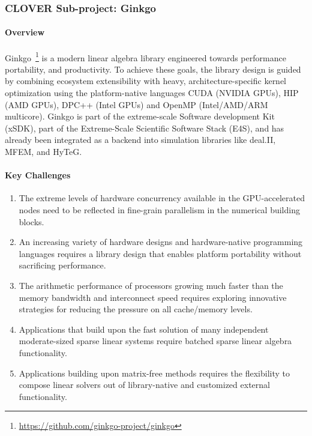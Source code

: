 \subsubsection{ CLOVER Sub-project: Ginkgo} \label{subsubsect:peeks}
\paragraph{Overview} 
Ginkgo~\footnote{\url{https://github.com/ginkgo-project/ginkgo}} is a modern
linear algebra library engineered towards performance portability, and
productivity. To achieve these goals, the library design is guided by combining
ecosystem extensibility with heavy, architecture-specific kernel optimization
using the platform-native languages CUDA (NVIDIA GPUs), HIP (AMD GPUs), DPC++
(Intel GPUs) and OpenMP (Intel/AMD/ARM multicore). Ginkgo is part of the
extreme-scale Software development Kit (xSDK), part of the Extreme-Scale
Scientific Software Stack (E4S), and has already been integrated as a backend
into simulation libraries like deal.II, MFEM, and HyTeG.



\paragraph{Key Challenges}
\begin{enumerate}
  \item The extreme levels of hardware concurrency available in the
		GPU-accelerated nodes need to be reflected in fine-grain parallelism in
		the numerical building blocks.
  \item An increasing variety of hardware designs and hardware-native
		programming languages requires a library design that enables platform
		portability without sacrificing performance.
  \item The arithmetic performance of processors growing much faster than the
		memory bandwidth and interconnect speed requires exploring innovative
		strategies for reducing the pressure on all cache/memory levels.
  \item Applications that build upon the fast solution of many independent
		moderate-sized sparse linear systems require batched sparse linear
		algebra functionality.
  \item Applications building upon matrix-free methods requires the flexibility
		to compose linear solvers out of library-native and customized external
		functionality.
\end{enumerate}

